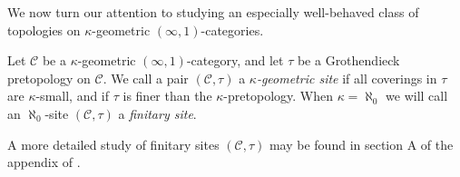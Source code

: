\documentclass[10pt]{article}
\newcommand{\C}{\mathcal C}
\theoremstyle{witharg}
\theoremstyle{witharg}
\theoremstyle{witharg2}
\begin{document}
\noindent We now turn our attention to studying an especially well-behaved class of topologies on $\kappa$-geometric $(\infty,1)$-categories.



\begin{definition}{}\label{kappa geometric sites}

    Let $\C$ be a $\kappa$-geometric $(\infty,1)$-category, and let $\tau$ be a Grothendieck pretopology on $\C$. We call a pair $(\C,\tau)$ a \emph{$\kappa$-geometric site} if all coverings in $\tau$ are $\kappa$-small, and if $\tau$ is finer than the $\kappa$-pretopology. When $\kappa=\aleph_0$ we will call an $\aleph_0$-site $(\C,\tau)$ a \emph{finitary site}.
    
\end{definition}

\begin{remark}{}
    A more detailed study of finitary sites $(\C,\tau)$ may be found in section A of the appendix of .
\end{remark}
\end{document}
